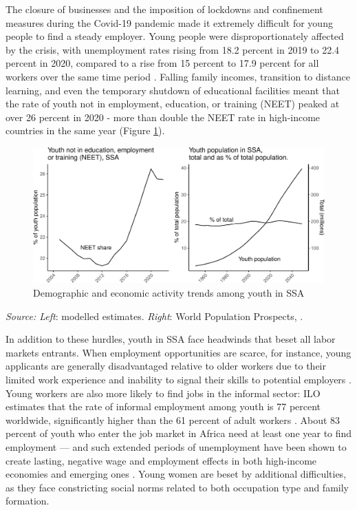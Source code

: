 \documentclass[
  a4paper, twoside, 12pt]{book}
\begin{document}
The closure of businesses and the imposition of lockdowns and confinement measures during the Covid-19 pandemic made it extremely difficult for young people to find a steady employer. Young people were disproportionately affected by the crisis, with unemployment rates rising from 18.2 percent in 2019 to 22.4 percent in 2020, compared to a rise from 15 percent to 17.9 percent for all workers over the same time period \autocite{ilo2022a,africandevelopmentbank2023}. Falling family incomes, transition to distance learning, and even the temporary shutdown of educational facilities meant that the rate of youth not in employment, education, or training (NEET) peaked at over 26 percent in 2020 - more than double the NEET rate in high-income countries in the same year (Figure \ref{fig:fig-neet}).

\begin{figure}[H]

{\centering \includegraphics{figures/fig-neet-1} 

}

\caption{Demographic and economic activity trends among youth in SSA}\label{fig:fig-neet}
\end{figure}

\footnotesize

\noindent \emph{Source: Left}: \textcite{ilo2023b} modelled estimates. \emph{Right}: World Population Prospects, \textcite{unitednations2022}.
\normalsize
\hfill\break

\noindent In addition to these hurdles, youth in SSA face headwinds that beset all labor markets entrants. When employment opportunities are scarce, for instance, young applicants are generally disadvantaged relative to older workers due to their limited work experience and inability to signal their skills to potential employers \autocite{acemoglu1998}. Young workers are also more likely to find jobs in the informal sector: ILO estimates that the rate of informal employment among youth is 77 percent worldwide, significantly higher than the 61 percent of adult workers \autocite{bonnet2018}. About 83 percent of youth who enter the job market in Africa need at least one year to find employment \autocite{africandevelopmentbank2022} --- and such extended periods of unemployment have been shown to create lasting, negative wage and employment effects in both high-income economies \autocite{moller2015,petreski2016,schmillen2017,emmenegger2017} and emerging ones \autocite{tiongson2007,mojsoska-blazevski2017}. Young women are beset by additional difficulties, as they face constricting social norms related to both occupation type and family formation.
\end{document}
